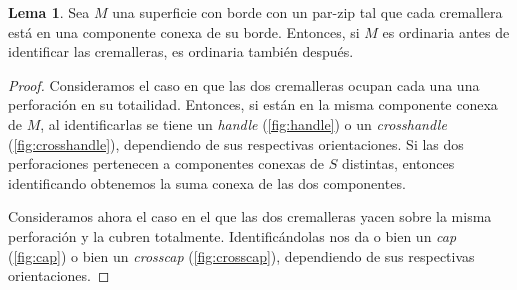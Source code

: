 \documentclass[10pt]{report}
\theoremstyle{definition}
\newtheorem{lema}[defin]{Lema}
\begin{document}
\begin{lema}%
Sea $M$ una superficie con borde con un par-zip tal que cada cremallera está en una componente conexa de su borde. Entonces, si $M$ es ordinaria antes de identificar las cremalleras, es ordinaria también después.\label{lema:superficie_ordinaria}
\end{lema}
\begin{proof}
Consideramos el caso en que las dos cremalleras ocupan cada una una perforación en su totailidad. Entonces, si están en la misma componente conexa de $M$, al identificarlas se tiene un \textit{handle} (\autoref{fig:handle}) o un \textit{crosshandle} (\autoref{fig:crosshandle}), dependiendo de sus respectivas orientaciones. Si las dos perforaciones pertenecen a componentes conexas de $S$ distintas, entonces identificando obtenemos la suma conexa de las dos componentes. 

Consideramos ahora el caso en el que las dos cremalleras yacen sobre la misma perforación y la cubren totalmente. Identificándolas nos da o bien un \textit{cap} (\autoref{fig:cap}) o bien un \textit{crosscap} (\autoref{fig:crosscap}), dependiendo de sus respectivas orientaciones.


\end{proof}
\end{document}
